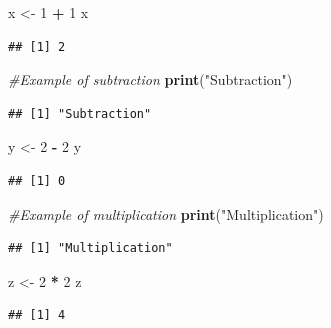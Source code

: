 \documentclass[]{article}
\newenvironment{Shaded}{\begin{snugshade}}{\end{snugshade}}
\newcommand{\CommentTok}[1]{\textcolor[rgb]{0.56,0.35,0.01}{\textit{#1}}}
\newcommand{\DecValTok}[1]{\textcolor[rgb]{0.00,0.00,0.81}{#1}}
\newcommand{\KeywordTok}[1]{\textcolor[rgb]{0.13,0.29,0.53}{\textbf{#1}}}
\newcommand{\NormalTok}[1]{#1}
\newcommand{\OperatorTok}[1]{\textcolor[rgb]{0.81,0.36,0.00}{\textbf{#1}}}
\newcommand{\StringTok}[1]{\textcolor[rgb]{0.31,0.60,0.02}{#1}}
\begin{document}
\begin{Shaded}
\begin{Highlighting}[]
\NormalTok{x <-}\StringTok{ }\DecValTok{1} \OperatorTok{+}\StringTok{ }\DecValTok{1}
\NormalTok{x}
\end{Highlighting}
\end{Shaded}

\begin{verbatim}
## [1] 2
\end{verbatim}

\begin{Shaded}
\begin{Highlighting}[]
\CommentTok{#Example of subtraction}
\KeywordTok{print}\NormalTok{(}\StringTok{"Subtraction"}\NormalTok{)}
\end{Highlighting}
\end{Shaded}

\begin{verbatim}
## [1] "Subtraction"
\end{verbatim}

\begin{Shaded}
\begin{Highlighting}[]
\NormalTok{y <-}\StringTok{ }\DecValTok{2} \OperatorTok{-}\StringTok{ }\DecValTok{2}
\NormalTok{y}
\end{Highlighting}
\end{Shaded}

\begin{verbatim}
## [1] 0
\end{verbatim}

\begin{Shaded}
\begin{Highlighting}[]
\CommentTok{#Example of multiplication}
\KeywordTok{print}\NormalTok{(}\StringTok{"Multiplication"}\NormalTok{)}
\end{Highlighting}
\end{Shaded}

\begin{verbatim}
## [1] "Multiplication"
\end{verbatim}

\begin{Shaded}
\begin{Highlighting}[]
\NormalTok{z <-}\StringTok{ }\DecValTok{2} \OperatorTok{*}\StringTok{ }\DecValTok{2}
\NormalTok{z}
\end{Highlighting}
\end{Shaded}

\begin{verbatim}
## [1] 4
\end{verbatim}
\end{document}
